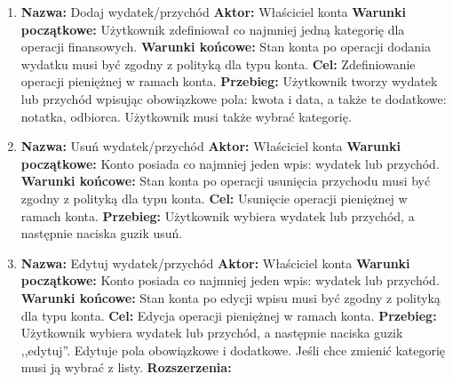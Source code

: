 \begin{enumerate}[labelwidth=\widthof{\ref{last-item}},label=\arabic*.]
\item \textbf{Nazwa:} Dodaj wydatek/przychód \newline
    \textbf{Aktor:} Właściciel konta \newline
    \textbf{Warunki początkowe:} Użytkownik zdefiniował co najmniej jedną kategorię dla operacji finansowych. \newline
    \textbf{Warunki końcowe:} Stan konta po operacji dodania wydatku musi być zgodny z polityką dla typu konta. \newline
    \textbf{Cel:} Zdefiniowanie operacji pieniężnej w ramach konta. \newline
    \textbf{Przebieg:} Użytkownik tworzy wydatek lub przychód wpisując obowiązkowe pola: kwota i data, a także te dodatkowe: notatka, odbiorca. Użytkownik musi także wybrać kategorię. 
\item \textbf{Nazwa:} Usuń wydatek/przychód \newline
    \textbf{Aktor:} Właściciel konta \newline
    \textbf{Warunki początkowe:} Konto posiada co najmniej jeden wpis: wydatek lub przychód. \newline
    \textbf{Warunki końcowe:} Stan konta po operacji usunięcia przychodu musi być zgodny z polityką dla typu konta. \newline
    \textbf{Cel:} Usunięcie operacji pieniężnej w ramach konta. \newline
    \textbf{Przebieg:} Użytkownik wybiera wydatek lub przychód, a następnie naciska guzik usuń. 
\item \textbf{Nazwa:} Edytuj wydatek/przychód \newline
    \textbf{Aktor:} Właściciel konta \newline
    \textbf{Warunki początkowe:} Konto posiada co najmniej jeden wpis: wydatek lub przychód. \newline
    \textbf{Warunki końcowe:} Stan konta po edycji wpisu musi być zgodny z polityką dla typu konta. \newline
    \textbf{Cel:} Edycja operacji pieniężnej w ramach konta. \newline
    \textbf{Przebieg:} Użytkownik wybiera wydatek lub przychód, a następnie naciska guzik ,,edytuj''. Edytuje pola obowiązkowe i dodatkowe. Jeśli chce zmienić kategorię musi ją wybrać z listy. \newline
    \textbf{Rozszerzenia: } 
    \begin{enumerate}[label=\alph*)]

\end{enumerate}
\end{enumerate}

